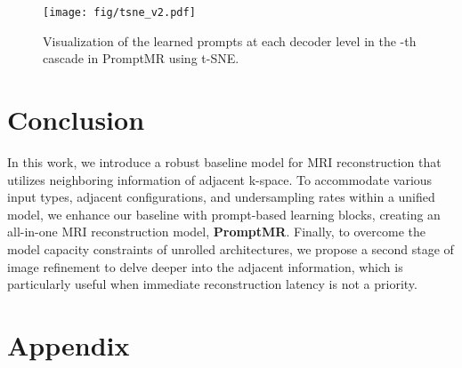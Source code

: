\documentclass[runningheads]{llncs}
\begin{document}
\begin{table}[t!]
    \centering
    \label{tab:abalation_all}
\end{table}

\begin{figure*}[t!]
\centering
\texttt{[image: fig/tsne\_v2.pdf]}
\caption{Visualization of the learned prompts at each decoder level in the -th cascade in PromptMR using t-SNE.}
\label{fig:tsne}
\end{figure*}
 




\section{Conclusion}

In this work, we introduce a robust baseline model for MRI reconstruction that utilizes neighboring information of adjacent k-space. To accommodate various input types, adjacent configurations, and undersampling rates within a unified model, we enhance our baseline with prompt-based learning blocks, creating an all-in-one MRI reconstruction model, \textbf{PromptMR}. Finally, to overcome the model capacity constraints of unrolled architectures, we propose a second stage of image refinement to delve deeper into the adjacent information, which is particularly useful when immediate reconstruction latency is not a priority.
 
\FloatBarrier




\newpage
\appendix
\section*{Appendix}
\end{document}
